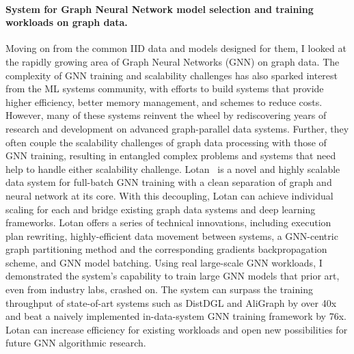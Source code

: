 \documentclass[letterpaper]{article}
\begin{document}
\paragraph{System for Graph Neural Network model selection and training workloads on graph data.}
Moving on from the common IID data and models designed for them, I looked at the rapidly growing area of Graph Neural Networks (GNN) on graph data. The complexity of GNN training and scalability challenges has also sparked interest from the ML systems community, with efforts to build systems that provide higher efficiency, better memory management, and schemes to reduce costs. However, many of these systems reinvent the wheel by rediscovering years of research and development on advanced graph-parallel data systems. Further, they often couple the scalability challenges of graph data processing with those of GNN training, resulting in entangled complex problems and systems that need help to handle either scalability challenge. Lotan~\cite{lotan} is a novel and highly scalable data system for full-batch GNN training with a clean separation of graph and neural network at its core. With this decoupling, Lotan can achieve individual scaling for each and bridge existing graph data systems and deep learning frameworks. Lotan offers a series of technical innovations, including execution plan rewriting, highly-efficient data movement between systems, a GNN-centric graph partitioning method and the corresponding gradients backpropagation scheme, and GNN model batching. Using real large-scale GNN workloads, I demonstrated the system's capability to train large GNN models that prior art, even from industry labs, crashed on. The system can surpass the training throughput of state-of-art systems such as DistDGL and AliGraph by over 40x and beat a naively implemented in-data-system GNN training framework by 76x. Lotan can increase efficiency for existing workloads and open new possibilities for future GNN algorithmic research.
\end{document}
